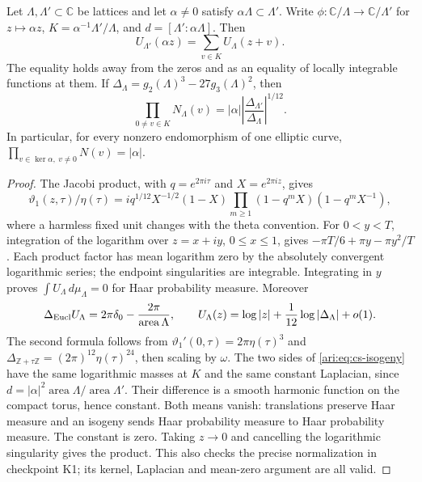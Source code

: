\begin{proposition}\label{ari:C.1.1}
Let $\Lambda,\Lambda'\subset\mathbb C$ be lattices and let
$\alpha\ne0$ satisfy $\alpha\Lambda\subset\Lambda'$. Write
$\phi:\mathbb C/\Lambda\to\mathbb C/\Lambda'$ for $z\mapsto\alpha z$,
$K=\alpha^{-1}\Lambda'/\Lambda$, and
$d=[\Lambda':\alpha\Lambda]$. Then
\begin{equation}\label{ari:eq:cs-isogeny}
 U_{\Lambda'}(\alpha z)=\sum_{v\in K}U_\Lambda(z+v).
\end{equation}
The equality holds away from the zeros and as an equality of locally
integrable functions at them. If $\Delta_\Lambda=g_2(\Lambda)^3-
27g_3(\Lambda)^2$, then
\[
 \prod_{0\ne v\in K}N_\Lambda(v)
 =|\alpha|\left|\frac{\Delta_{\Lambda'}}{\Delta_\Lambda}\right|^{1/12}.
\]
In particular, for every nonzero endomorphism of one elliptic curve,
$\prod_{v\in\ker\alpha,\ v\ne0}N(v)=|\alpha|$.
\end{proposition}
\begin{proof}
The Jacobi product, with $q=e^{2\pi i\tau}$ and
$X=e^{2\pi iz}$, gives
\[
 \vartheta _1(z,\tau)/\eta(\tau)
 =i q^{1/12}X^{-1/2}(1-X)
     \prod_{m\ge1}(1-q^mX)(1-q^mX^{-1}),
\]
where a harmless fixed unit changes with the theta convention. For
$0<y<T$, integration of the logarithm over $z=x+iy$, $0\le x\le1$,
gives $-\pi T/6+\pi y-\pi y^2/T$. Each product factor has mean logarithm
zero by the absolutely convergent logarithmic series; the endpoint
singularities are integrable. Integrating in $y$ proves
$\int U_\Lambda\,d\mu_\Lambda=0$ for Haar probability measure.
Moreover
\[
 \Delta_{\rm Eucl}U_\Lambda
   =2\pi\delta_0-\frac{2\pi}{\operatorname{area}\Lambda},\qquad
 U_\Lambda(z)=\log|z|+\frac1{12}\log|\Delta_\Lambda|+o(1).
\]
The second formula follows from
$\vartheta _1'(0,\tau)=2\pi\eta(\tau)^3$ and
$\Delta_{\mathbb Z+\tau\mathbb Z}=(2\pi)^{12}\eta(\tau)^{24}$,
then scaling by $\omega$. The two sides of
\eqref{ari:eq:cs-isogeny} have the same logarithmic masses at $K$ and the
same constant Laplacian, since
$d=|\alpha|^2\operatorname{area}\Lambda/
\operatorname{area}\Lambda'$. Their difference is a smooth harmonic
function on the compact torus, hence constant. Both means vanish:
translations preserve Haar measure and an isogeny sends Haar
probability measure to Haar probability measure. The constant is zero.
Taking $z\to0$ and cancelling the logarithmic singularity gives the
product. This also checks the precise normalization in checkpoint K1;
its kernel, Laplacian and mean-zero argument are all valid.
\end{proof}
